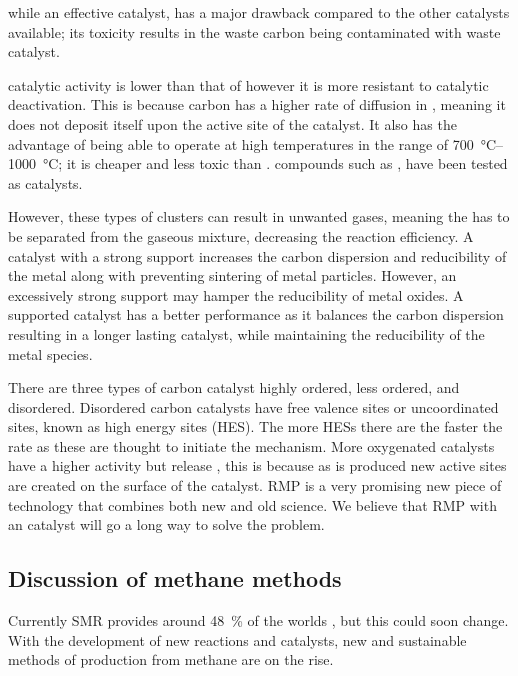  while an effective catalyst, has a major drawback compared to the other catalysts available; its toxicity results in the waste carbon being contaminated with waste  catalyst.
 
 catalytic activity is lower than that of  however it is more resistant to catalytic deactivation.
This is because carbon has a higher rate of diffusion in , meaning it does not deposit itself upon the active site of the catalyst.
It also has the advantage of being able to operate at high temperatures in the range of \SIrange{700}{1000}{\celsius}; it is cheaper and less toxic than .
 compounds such as \ce{[Fe(CO)5]}, \ce{[Fe(cp)2]} have been tested as catalysts.

However, these types of clusters can result in unwanted gases, meaning the  has to be separated from the gaseous mixture, decreasing the reaction efficiency.
A catalyst with a strong support increases the carbon dispersion and reducibility of the metal along with preventing sintering of metal particles.
However, an excessively strong support may hamper the reducibility of metal oxides.
A supported catalyst has a better performance as it balances the carbon dispersion resulting in a longer lasting catalyst, while maintaining the reducibility of the metal species.

There are three types of carbon catalyst highly ordered, less ordered, and disordered.
Disordered carbon catalysts have free valence sites or uncoordinated sites, known as high energy sites (HES).
The more HESs there are the faster the rate as these are thought to initiate the mechanism.
More oxygenated catalysts have a higher activity but release , this is because as  is produced new active sites are created on the surface of the catalyst.
RMP is a very promising new piece of technology that combines both new and old science.
We believe that RMP with an  catalyst will go a long way to solve the  problem.

\subsection{Discussion of methane methods}%
\label{sub:discussion_of_methane_methods}
Currently SMR provides around \SI{48}{\percent} of the worlds \cite{SBN2020}, but this could soon change.
With the development of new reactions and catalysts, new and sustainable methods of  production from methane are on the rise.

